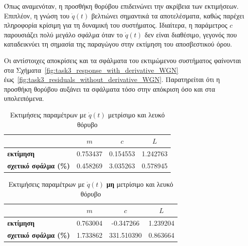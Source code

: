 \documentclass[a4paper,12pt]{article}
\begin{document}
Όπως αναμενόταν, η προσθήκη θορύβου επιδεινώνει την ακρίβεια των εκτιμήσεων. Επιπλέον, η γνώση του $\dot{q}(t)$ βελτιώνει σημαντικά τα αποτελέσματα, καθώς παρέχει πληροφορία κρίσιμη για τη δυναμική του συστήματος. Ιδιαίτερα, η παράμετρος $c$ παρουσιάζει πολύ μεγάλο σφάλμα όταν το $\dot{q}(t)$ δεν είναι διαθέσιμο, γεγονός που καταδεικνύει τη σημασία της παραγώγου στην εκτίμηση του αποσβεστικού όρου.

Οι αντίστοιχες αποκρίσεις και τα σφάλματα του εκτιμώμενου συστήματος φαίνονται στα Σχήματα~\ref{fig:task3_response_with_derivative_WGN} έως~\ref{fig:task3_residuals_without_derivative_WGN}. Παρατηρείται ότι η προσθήκη θορύβου αυξάνει τα σφάλματα τόσο στην απόκριση όσο και στα υπολειπόμενα.

\begin{table}[h!]
\centering
\begin{tabular}{|l|c|c|c|}
\hline
\multicolumn{1}{|c|}{} & \multicolumn{1}{c|}{$m$} & \multicolumn{1}{c|}{$c$} & \multicolumn{1}{c|}{$L$} \\
\hline
\textbf{εκτίμηση} & 0.753437 & 0.154553 & 1.242763 \\
\textbf{σχετικό σφάλμα (\%)} & 0.458269 & 3.035263 & 0.578945 \\
\hline
\end{tabular}
\caption{Εκτιμήσεις παραμέτρων με $\dot{q}(t)$ μετρίσιμο και λευκό θόρυβο}
\label{tab:task3_estimations_with_derivative_WGN}
\end{table}

\begin{table}[h!]
\centering
\begin{tabular}{|l|c|c|c|}
\hline
\multicolumn{1}{|c|}{} & \multicolumn{1}{c|}{$m$} & \multicolumn{1}{c|}{$c$} & \multicolumn{1}{c|}{$L$} \\
\hline
\textbf{εκτίμηση} & 0.763004 & -0.347266 & 1.239204 \\
\textbf{σχετικό σφάλμα (\%)} & 1.733862 & 331.510390 & 0.863664 \\
\hline
\end{tabular}
\caption{Εκτιμήσεις παραμέτρων με $\dot{q}(t)$ \textbf{μη} μετρίσιμο και λευκό θόρυβο}
\label{tab:task3_estimations_without_derivative_WGN}
\end{table}
\end{document}
